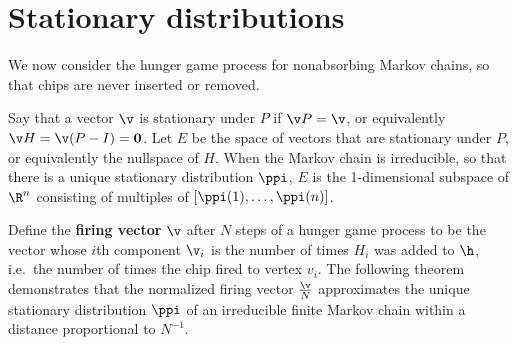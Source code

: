 \section{Stationary distributions}\label{section: stationary distributions}
We now consider the hunger game process for nonabsorbing Markov chains, 
so that chips are never inserted or removed.

Say that a vector $\v$ is stationary under $P$ if $\v P = \v$,
or equivalently $\v H = \v(P-I) = {\bf 0}$.
Let $E$ be the space of vectors that are stationary under $P$,
or equivalently the nullspace of $H$.
When the Markov chain is irreducible,
so that there is a unique stationary distribution $\ppi$,
$E$ is the 1-dimensional subspace of $\R^n$
consisting of multiples of $[\ppi(1),\dots,\ppi(n)]$.

Define the \textbf{firing vector} $\v$ 
after $N$ steps of a hunger game process 
to be the vector whose $i$th component $\v_i$ is 
the number of times $H_i$ was added to $\h$, 
i.e.\ the number of times the chip fired to vertex $v_i$.
The following theorem demonstrates that 
the normalized firing vector $\frac{\v}{N}$ 
approximates the unique stationary distribution $\ppi$ 
of an irreducible finite Markov chain 
within a distance proportional to $N^{-1}$.

